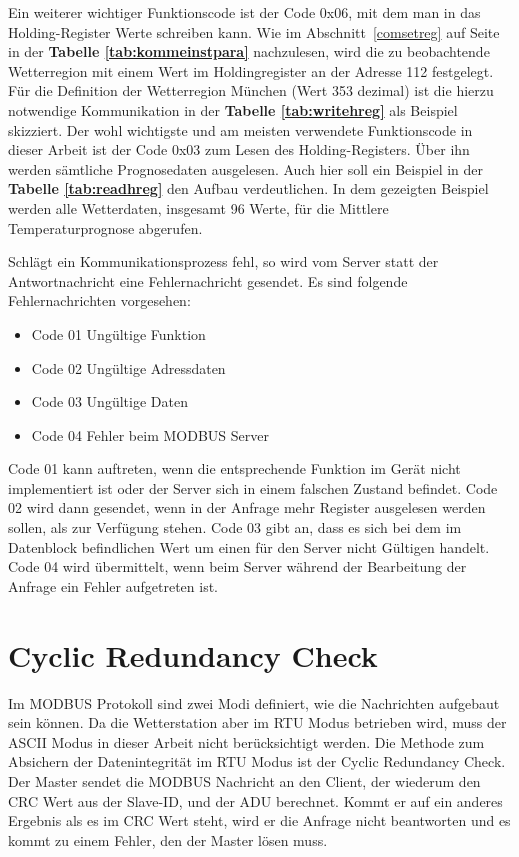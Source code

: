 Ein weiterer wichtiger Funktionscode ist der Code 0x06, mit dem man in das Holding-Register Werte schreiben kann. Wie im Abschnitt~\ref{comsetreg} auf Seite~\pageref{comsetreg} in der \textbf{Tabelle \ref{tab:kommeinstpara}} nachzulesen, wird die zu beobachtende Wetterregion mit einem Wert im Holdingregister an der Adresse 112 festgelegt. Für die Definition der Wetterregion München (Wert 353 dezimal) ist die hierzu notwendige Kommunikation in der \textbf{Tabelle \ref{tab:writehreg}} als Beispiel skizziert. Der wohl wichtigste und am meisten verwendete Funktionscode in dieser Arbeit ist der Code 0x03 zum Lesen des Holding-Registers. Über ihn werden sämtliche Prognosedaten ausgelesen. Auch hier soll ein Beispiel in der \textbf{Tabelle \ref{tab:readhreg}} den Aufbau verdeutlichen. In dem gezeigten Beispiel werden alle Wetterdaten, insgesamt 96 Werte, für die Mittlere Temperaturprognose abgerufen. 

Schlägt ein Kommunikationsprozess fehl, so wird vom Server statt der Antwortnachricht eine Fehlernachricht gesendet. Es sind folgende Fehlernachrichten vorgesehen:
\begin{itemize}
\item Code 01 Ungültige Funktion
\item Code 02 Ungültige Adressdaten
\item Code 03 Ungültige Daten
\item Code 04 Fehler beim MODBUS Server
\end{itemize}
Code 01 kann auftreten, wenn die entsprechende Funktion im Gerät nicht implementiert ist oder der Server sich in einem falschen Zustand befindet. Code 02 wird dann gesendet, wenn in der Anfrage mehr Register ausgelesen werden sollen, als zur Verfügung stehen. Code 03 gibt an, dass es sich bei dem im Datenblock befindlichen Wert um einen für den Server nicht Gültigen handelt. Code 04 wird übermittelt, wenn beim Server während der Bearbeitung der Anfrage ein Fehler aufgetreten ist.    
\section{Cyclic Redundancy Check}\label{chp:CRC}
Im MODBUS Protokoll sind zwei Modi definiert, wie die Nachrichten aufgebaut sein können. Da die Wetterstation aber im RTU Modus betrieben wird, muss der ASCII Modus in dieser Arbeit nicht berücksichtigt werden. Die Methode zum Absichern der Datenintegrität im RTU Modus ist der Cyclic Redundancy Check. Der Master sendet die MODBUS Nachricht an den Client, der wiederum den CRC Wert aus der Slave-ID, und der ADU berechnet. Kommt er auf ein anderes Ergebnis als es im CRC Wert steht, wird er die Anfrage nicht beantworten und es kommt zu einem Fehler, den der Master lösen muss.\cite{modicon} 

